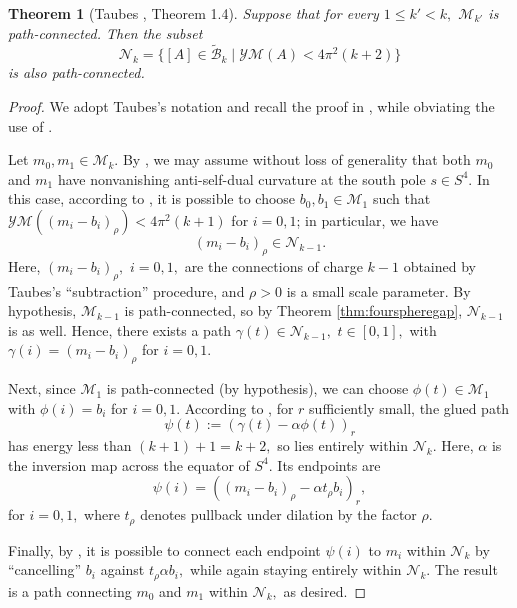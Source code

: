 \documentclass[12pt]{amsart}
\newcommand{\YM}{\mathcal{YM}}
\newcommand{\LB}{\left[}
\newcommand{\RB}{\right]}
\renewcommand{\1}{{\mathbf 1}}
\newcommand{\calB}{\mathcal{B}}
\newcommand{\calM}{\mathcal{M}}
\newcommand{\calN}{\mathcal{N}}
\newtheorem{thm}{Theorem}[section]
\theoremstyle{others}
\numberwithin{equation}{section}
\begin{document}
\begin{thm}[Taubes \cite{taubespathconnected}, Theorem 1.4]\label{thm:taubespathconnected}
Suppose that for every $1 \leq k' < k,$ $\calM_{k'}$ is path-connected. Then the subset
\begin{equation}\label{leq2}
\calN_k = \{ \LB A \RB \in \tilde{\calB}_k \mid \YM(A) < 4 \pi^2 \left( k + 2 \right) \}
\end{equation}
is also path-connected.
\end{thm}
\begin{proof} We adopt Taubes's notation and recall the proof in \cite[\S 6]{taubespathconnected}, while obviating the use of \cite[Prop. 6.4]{taubespathconnected}. 


Let $m_0, m_1 \in \calM_k.$ By \cite[Lemma 6.3]{taubespathconnected}, we may assume without loss of generality that both $m_0$ and $m_1$ have nonvanishing anti-self-dual curvature %
at the south pole $s \in S^4.$ In this case,
according to \cite[Prop. 6.2]{taubespathconnected}, it is possible to choose $b_0, b_1 \in \mathcal{M}_1$ such that $\YM((m_i - b_i)_\rho) < 4 \pi^2 \left( k + 1 \right)$
for $i = 0,1$; in particular, we have
$$(m_i - b_i)_\rho \in \calN_{k-1}.$$
Here, $(m_i - b_i)_\rho,$ $i = 0,1,$ are the connections of charge $k -1$ obtained by Taubes's ``subtraction'' procedure, and $\rho > 0$ is a small scale parameter. By hypothesis, $\calM_{k-1}$ is path-connected, so by Theorem \ref{thm:fourspheregap}, $\calN_{k-1}$  is as well. Hence, there exists a path $\gamma(t) \in \calN_{k-1},$ $t \in \LB 0,1 \RB,$ with $\gamma(i) = (m_i - b_i)_\rho$ for $i = 0,1.$

Next, since $\calM_1$ is path-connected (by hypothesis), we can choose $\phi(t) \in \calM_1$ with $\phi(i) = b_i$ for $i = 0,1.$ According to \cite[Lemma 6.5]{taubespathconnected}, %
for $r$ sufficiently small, the glued path
$$\psi(t):= \left( \gamma(t) - \alpha \phi(t) \right)_r$$
has energy less than $(k + 1) + 1 = k + 2,$ so lies entirely within $\calN_k.$ Here, $\alpha$ is the inversion map across the equator of $S^4$. Its endpoints are
$$\psi(i) = \left( (m_i - b_i)_\rho - \alpha t_\rho b_i \right)_r,$$
for $i = 0,1,$ where $t_\rho$ denotes pullback under dilation by the factor $\rho.$

Finally, by \cite[Lemma 6.6]{taubespathconnected}, it is possible to connect each endpoint $\psi(i)$ to $m_i$ within $\calN_k$ by ``cancelling'' $b_i$ against $t_\rho \alpha b_i,$ while again staying entirely within $\calN_k.$ The result is a path connecting $m_0$ and $m_1$ within $\calN_k,$ as desired.
\end{proof}
\end{document}

